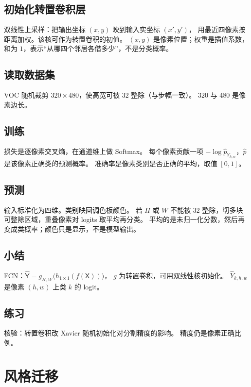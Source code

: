 \subsection{初始化转置卷积层}

双线性上采样：把输出坐标 $(x,y)$ 映到输入实坐标 $(x',y')$，
用最近四像素按距离加权。该核可作为转置卷积的初值。
$(x,y)$ 是像素位置；权重是插值系数，和为 $1$，表示“从哪四个邻居各借多少”，不是分类概率。

\subsection{读取数据集}

VOC 随机裁剪 $320\times 480$，使高宽可被 $32$ 整除（与步幅一致）。
$320$ 与 $480$ 是像素边长。

\subsection{训练}

损失是逐像素交叉熵，在通道维上做 Softmax。
每个像素贡献一项 $-\log\hat p_{Y_{h,w}}$，$\hat p$ 是该像素正确类的预测概率。
准确率是像素类别是否正确的平均，取值 $[0,1]$。

\subsection{预测}

输入标准化为四维。类别映回调色板颜色。
若 $H$ 或 $W$ 不能被 $32$ 整除，切多块可整除区域，重叠像素对 logits 取平均再分类。
平均的是未归一化分数，然后再变成类概率；颜色只是显示，不是模型输出。

\subsection{小结}

FCN：$\hat{\mathsf{Y}}=g_{H,W}\bigl(h_{1\times 1}(f(\mathsf{X}))\bigr)$，
$g$ 为转置卷积，可用双线性核初始化。
$\hat Y_{k,h,w}$ 是像素 $(h,w)$ 上类 $k$ 的 logit。

\subsection{练习}

核验：转置卷积改 Xavier 随机初始化对分割精度的影响。
精度仍是像素正确比例。

\section{风格迁移}

